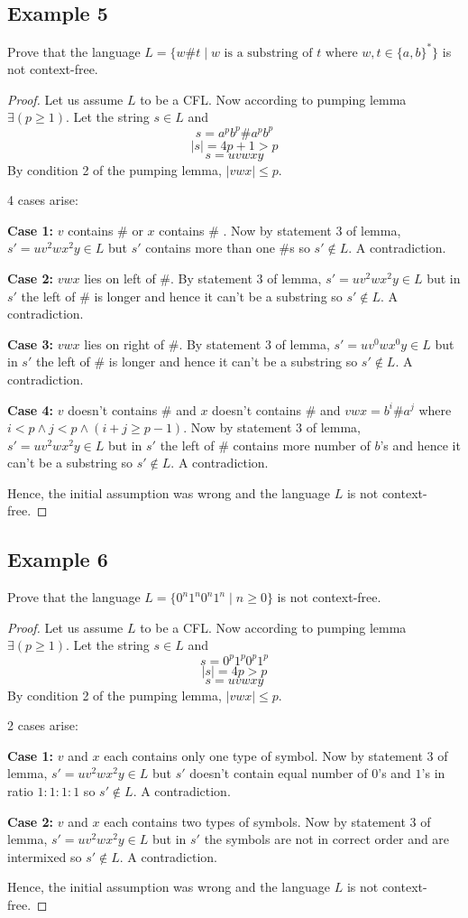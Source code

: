 \documentclass{article}
\begin{document}
\subsection{Example 5}

Prove that the language $L=\{ w\#t \mid w \text{ is a substring of } t \text{ where } w, t \in \{a, b\}^* \}$ is not context-free.

\begin{proof}
Let us assume $L$ to be a CFL. Now according to pumping lemma $\exists(p\ge1)$.
Let the string $s\in L$ and $$s=a^pb^p\#a^pb^p$$ $$\mid s\mid=4p+1>p $$ $$s=uvwxy$$
By condition 2 of the pumping lemma, $|vwx| \leq p$. 

4 cases arise:

\textbf{Case 1:} $v$ contains \# or $x$ contains \# .
Now by statement 3 of lemma, $s'=uv^2wx^2y\in L$ but $s'$ contains more than one \#s so $s'\notin L$. A contradiction.

\textbf{Case 2:}  $vwx$ lies on left of $\#$. By statement 3 of lemma, $s'=uv^2wx^2y\in L$ but in $s'$ the left of $\#$ is longer and hence it can't be a substring so $s'\notin L$. A contradiction.

\textbf{Case 3:}  $vwx$ lies on right of $\#$. By statement 3 of lemma, $s'=uv^0wx^0y\in L$ but in $s'$ the left of $\#$ is longer and hence it can't be a substring so $s'\notin L$. A contradiction.

\textbf{Case 4:} $v$ doesn't contains \# and $x$ doesn't contains \# and $vwx=b^i\#a^j$ where $i<p\wedge j<p\wedge (i+j\ge p-1)$. Now by statement 3 of lemma, $s'=uv^2wx^2y\in L$ but in $s'$ the left of $\#$ contains more number of $b$'s and hence it can't be a substring so $s'\notin L$. A contradiction.

Hence, the initial assumption was wrong and the language $L$ is not context-free.
\end{proof}

\subsection{Example 6}

Prove that the language $L=\{ 0^n1^n0^n1^n \mid n\ge 0\}$ is not context-free.

\begin{proof}
Let us assume $L$ to be a CFL. Now according to pumping lemma $\exists(p\ge1)$.
Let the string $s\in L$ and $$s=0^p1^p0^p1^p$$ $$\mid s\mid=4p>p $$ $$s=uvwxy$$
By condition 2 of the pumping lemma, $|vwx| \leq p$.

2 cases arise:

\textbf{Case 1:} $v$ and $x$ each contains only one type of symbol.
Now by statement 3 of lemma, $s'=uv^2wx^2y\in L$ but $s'$ doesn't contain equal number of $0$'s and $1$'s in ratio $1:1:1:1$ so $s'\notin L$. A contradiction.

\textbf{Case 2:} $v$ and $x$ each contains two types of symbols.
Now by statement 3 of lemma, $s'=uv^2wx^2y\in L$ but in $s'$ the symbols are not in correct order and are intermixed so $s'\notin L$. A contradiction.


Hence, the initial assumption was wrong and the language $L$ is not context-free.
\end{proof}
\end{document}
